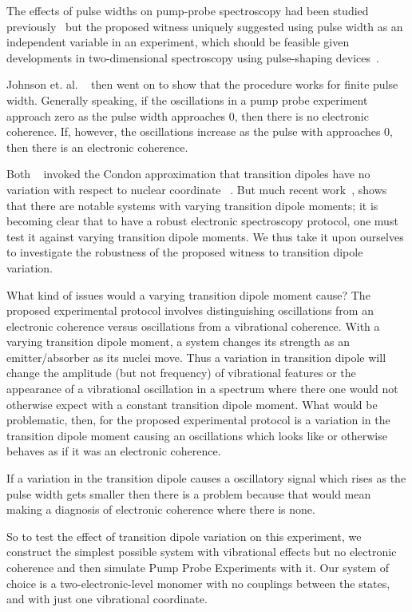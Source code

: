The effects of pulse widths on pump-probe spectroscopy had been studied previously~\cite{pulseWidth} but the proposed witness uniquely suggested using pulse width as an independent variable in an experiment, which should be feasible given developments in two-dimensional spectroscopy using pulse-shaping devices~\cite{pulse1,pulse2}.

Johnson et. al.  ~\cite{allanWitness} then went on to show that the procedure works for finite pulse width.  Generally speaking, if the oscillations in a pump probe experiment approach zero as the pulse width approaches 0, then there is no electronic coherence.  If, however, the oscillations increase as the pulse with approaches 0, then there is an electronic coherence.

Both ~\cite{witness,allanWitness} invoked the Condon approximation that transition dipoles have no variation with respect to nuclear coordinate ~\cite{Condon,FranckCondon}. But much recent work~\cite{photosyntheticKappa,MavrosNonCondon,hellerGraphene}, shows that there are notable systems with varying transition dipole moments; it is becoming clear that to have a robust electronic spectroscopy protocol, one must test it against varying transition dipole moments.  We thus take it upon ourselves to investigate the robustness of the proposed witness to transition dipole variation.

What kind of issues would a varying transition dipole moment cause?  The proposed experimental protocol involves distinguishing oscillations from an electronic coherence versus oscillations from a vibrational coherence.  With a varying transition dipole moment, a system changes its strength as an emitter/absorber as its nuclei move.  Thus a variation in transition dipole will change the amplitude (but not frequency) of vibrational features or the appearance of a vibrational oscillation in a spectrum where there one would not otherwise expect with a constant transition dipole moment.  What would be problematic, then, for the proposed experimental protocol is a variation in the transition dipole moment causing an oscillations which looks like or otherwise behaves as if it was an electronic coherence.

If a variation in the transition dipole causes a oscillatory signal which rises as the pulse width gets smaller then there is a problem because that would mean making a diagnosis of electronic coherence where there is none.

So to test the effect of transition dipole variation on this experiment, we construct the simplest possible system with vibrational effects but no electronic coherence and then simulate Pump Probe Experiments with it.  Our system of choice is a two-electronic-level monomer with no couplings between the states, and with just one vibrational coordinate.

